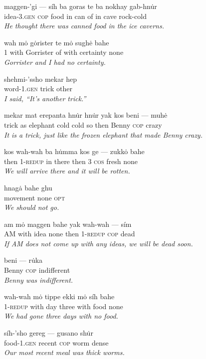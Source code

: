 \documentclass{article}[10pt]
\begin{document}
\begin{exe}
\ex 
\gll maggen-'gi --- s\'{i}h ba goras te ba nokhay gab-hn\.{u}r\\
idea-3.\textsc{gen} \textsc{cop} food in can of in cave rock-cold\\
\trans \emph{He thought there was canned food in the ice caverns.}

\ex
\gll wah m\.{o} g\.{o}rister te m\.{o} sugh\.{e} bahe\\
1 with Gorrister of with certainty none\\
\trans \emph{Gorrister and I had no certainty.}

\ex
\gll shehmi-'ssho mekar hep\\
word-1.\textsc{gen} trick other\\
\trans \emph{I said, ``It's another trick.''}

\ex
\gll mekar mat erepanta hn\.{u}r hn\.{u}r yak kos beni --- muh\.{e}\\
trick as elephant cold cold so then Benny \textsc{cop} crazy\\
\trans \emph{It is a trick, just like the frozen elephant that made Benny crazy.}

\ex
\gll kos wah-wah ba h\.{u}mma kos ge --- zukk\.{o} bahe\\
then 1-\textsc{redup} in there then 3 \textsc{cos} fresh none\\
\trans \emph{We will arrive there and it will be rotten.}

\ex
\gll hnag\.{a} bahe ghu\\
movement none \textsc{opt}\\
\trans \emph{We should not go.}

\ex
\gll am m\.{o} maggen bahe yak wah-wah --- s\'{i}m\\
AM with idea none then 1-\textsc{redup} \textsc{cop} dead\\
\trans \emph{If AM does not come up with any ideas, we will be dead soon.}


\ex 
\gll beni --- r\.{u}ka\\
Benny \textsc{cop} indifferent\\
\trans \emph{Benny was indifferent.}

\ex
\gll wah-wah m\.{o} tippe ekki m\.{o} s\'{i}h bahe\\
1-\textsc{redup} with day three with food none\\
\trans \emph{We had gone three days with no food.}

\ex
\gll s\'{i}h-'sho gereg --- gusano sh\.{u}r\\
food-1.\textsc{gen} recent \textsc{cop} worm dense\\
\trans \emph{Our most recent meal was thick worms.}


\end{exe}
\end{document}

